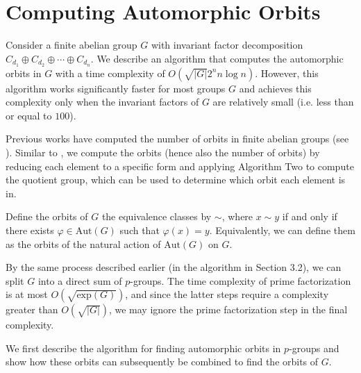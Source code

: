 \documentclass[11pt]{amsart}
\theoremstyle{definition}
\renewcommand{\phi}{\varphi}
\newcommand{\Aut}{\text{Aut}}
\numberwithin{equation}{section}
\begin{document}

\section{Computing Automorphic Orbits}
Consider a finite abelian group $G$ with invariant factor decomposition $C_{d_1} \oplus C_{d_2} \oplus \cdots \oplus C_{d_n}.$ We describe an algorithm that computes the automorphic orbits in $G$ with a time complexity of $O(\sqrt{|G|}2^n  n \log n)$. However, this algorithm works significantly faster for most groups $G$ and achieves this complexity only when the invariant factors of $G$ are relatively small (i.e. less than or equal to $100$). 

Previous works have computed the number of orbits in finite abelian groups (see \cite{SS,dutta}). Similar to \cite{rocca2011automorphismclasseselementsfinitely}, we compute the orbits (hence also the number of orbits) by reducing each element to a specific form and applying Algorithm Two to compute the quotient group, which can be used to determine which orbit each element is in. 

Define the orbits of $G$  the equivalence classes by $\sim$, where $x \sim y$ if and only if there exists $\phi \in \Aut(G)$ such that $\phi(x) = y$. Equivalently, we can define them as the orbits of the natural action of $\Aut(G)$ on $G$. 

By the same process described earlier (in the algorithm in Section 3.2), we can split $G$ into a direct sum of $p$-groups. The time complexity of prime factorization is at most $O(\sqrt{\text{exp}(G)})$, and since the latter steps require a complexity greater than $O(\sqrt{|G|})$, we may ignore the prime factorization step in the final complexity. 

We first describe the algorithm for finding automorphic orbits in $p$-groups and show how these orbits can subsequently be combined to find the orbits of $G$.
\end{document}
